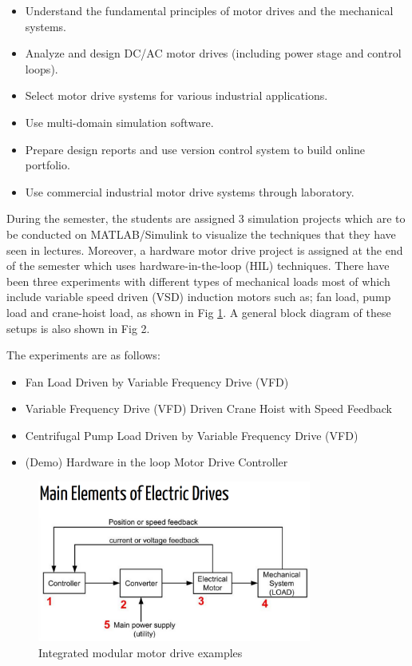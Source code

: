 \documentclass[journal]{IEEEtran}
\begin{document}
\begin{itemize}
\item Understand the fundamental principles of motor drives and the mechanical systems.
\item Analyze and design DC/AC motor drives (including power stage and control loops).
\item Select motor drive systems for various industrial applications.
\item Use multi-domain simulation software.
\item Prepare design reports and use version control system to build online portfolio.
\item Use commercial industrial motor drive systems through laboratory.
\end{itemize}

During the semester, the students are assigned 3 simulation projects which are to be conducted on MATLAB/Simulink to visualize the techniques that they have seen in lectures. Moreover, a hardware motor drive project is assigned at the end of the semester which uses hardware-in-the-loop (HIL) techniques. There have been three experiments with different types of mechanical loads most of which include variable speed driven (VSD) induction motors such as; fan load, pump load and crane-hoist load, as shown in Fig \ref{fig1}. A general block diagram of these setups is also shown in Fig 2.



The experiments are as follows:
\begin{itemize}
\item Fan Load Driven by Variable Frequency Drive (VFD)
\item Variable Frequency Drive (VFD) Driven Crane Hoist with Speed Feedback
\item Centrifugal Pump Load Driven by Variable Frequency Drive (VFD)
\item (Demo) Hardware in the loop Motor Drive Controller
\end{itemize}

\begin{figure}[h]
  \centering
  \includegraphics[width=9cm]{blockdia1}
  \caption{Integrated modular motor drive examples}
  \label{fig1}
\end{figure}
\end{document}
